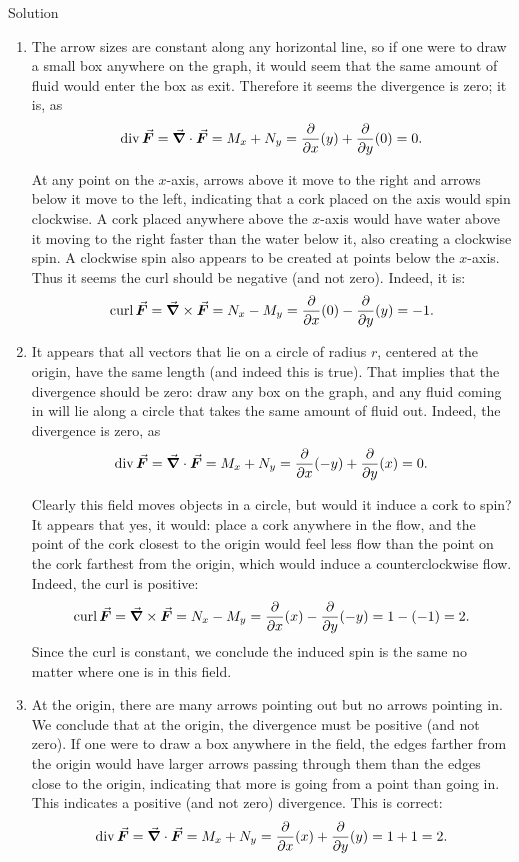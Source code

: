\begin{example}
Solution 


\begin{enumerate}
	\item The arrow sizes are constant along any horizontal line, so if one were to draw a small box anywhere on the graph, it would seem that the same amount of fluid would enter the box as exit. Therefore it seems the divergence is zero; it is, as 
	$$\divv\vec F = \vec{\nabla} \cdot \vec F = M_x + N_y = \frac{\partial}{\partial x}(y) + \frac{\partial}{\partial y}(0) = 0.$$

	At any point on the $x$-axis, arrows above it move to the right and arrows below it move to the left, indicating that a cork placed on the axis would spin clockwise. A cork placed anywhere above the $x$-axis would have water above it moving to the right faster than the water below it, also creating a clockwise spin. A clockwise spin also appears to be created at points below the $x$-axis. Thus it seems the curl should be negative (and not zero). Indeed, it is:
	$$\curl \vec F = \vec{\nabla}\times\vec F = N_x-M_y = \frac{\partial}{\partial x}(0) - \frac{\partial}{\partial y}(y) = -1.$$
	
	\item It appears that all vectors that lie on a circle of radius $r$, centered at the  origin, have the same length (and indeed this is true). That implies that the divergence should be zero: draw any box on the graph, and any fluid coming in will lie along a circle that takes the same amount of fluid out. Indeed, the divergence is zero, as
	$$\divv\vec F = \vec{\nabla} \cdot \vec F = M_x + N_y = \frac{\partial}{\partial x}(-y) + \frac{\partial}{\partial y}(x) = 0.$$
	
		Clearly this field moves objects in a circle, but would it induce a cork to spin? It appears that yes, it would: place a cork anywhere in the flow, and the point of the cork closest to the origin would feel less flow than the point on the cork farthest from the origin, which would induce a counterclockwise flow. Indeed, the curl is positive:
	$$\curl \vec F = \vec{\nabla}\times\vec F = N_x-M_y = \frac{\partial}{\partial x}(x) - \frac{\partial}{\partial y}(-y) = 1-(-1) = 2.$$
	Since the curl is constant, we conclude the induced spin is the same no matter where one is in this field.
	
	\item At the origin, there are many arrows pointing out but no arrows pointing in. We conclude that at the origin, the divergence must be positive (and not zero). If one were to draw a box anywhere in the field, the edges farther from the origin would have larger arrows passing through them than the edges close to the origin, indicating that more is going from a point than going in. This indicates a positive (and not zero) divergence. This is correct:
	$$\divv\vec F = \vec{\nabla} \cdot \vec F = M_x + N_y = \frac{\partial}{\partial x}(x) + \frac{\partial}{\partial y}(y) = 1+1=2.$$
	

\end{enumerate}
\end{example}
